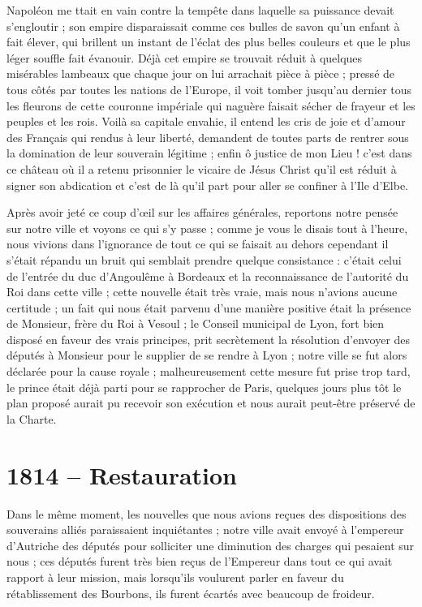 \documentclass[11pt,a4paper]{report}
\begin{document}
Napoléon me ttait en vain contre la tempête dans laquelle sa puissance devait s'engloutir ; son empire disparaissait comme ces bulles de savon qu'un enfant à fait élever, qui brillent un instant de l'éclat des plus belles couleurs et que le plus léger souffle fait évanouir. Déjà cet empire se trouvait réduit à quelques misérables lambeaux que chaque jour on lui arrachait pièce à pièce ; pressé de tous côtés par toutes les nations de l'Europe, il voit tomber jusqu'au dernier tous les fleurons de cette couronne impériale qui naguère faisait sécher de frayeur et les peuples et les rois. Voilà sa capitale envahie, il entend les cris de joie et d'amour des Français qui rendus à leur liberté, demandent de toutes parts de rentrer sous la domination de leur souverain légitime ; enfin ô justice de mon Lieu ! c'est dans ce château où il a retenu prisonnier le vicaire de Jésus Christ qu'il est réduit à signer son abdication et c'est de là qu'il part pour aller se confiner à l'Ile d'Elbe.

Après avoir jeté ce coup d'œil sur les affaires générales, reportons notre pensée sur notre ville et voyons ce qui s'y passe ; comme je vous le disais tout à l'heure, nous vivions dans l'ignorance de tout ce qui se faisait au dehors cependant il s'était répandu un bruit qui semblait prendre quelque consistance : c'était celui de l'entrée du duc d'Angoulême à Bordeaux et la reconnaissance de l'autorité du Roi dans cette ville ; cette nouvelle était très vraie, mais nous n'avions aucune certitude ; un fait qui nous était parvenu d'une manière positive était la présence de Monsieur, frère du Roi à Vesoul ; le Conseil municipal de Lyon, fort bien disposé en faveur des vrais principes, prit secrètement la résolution d'envoyer des députés à Monsieur pour le supplier de se rendre à Lyon ; notre ville se fut alors déclarée pour la cause royale ; malheureusement cette mesure fut prise trop tard, le prince était déjà parti pour se rapprocher de Paris, quelques jours plus tôt le plan proposé aurait pu recevoir son exécution et nous aurait peut-être préservé de la Charte.

\section*{1814 -- Restauration}

Dans le même moment, les nouvelles que nous avions reçues des dispositions des souverains alliés paraissaient inquiétantes ; notre ville avait envoyé à l'empereur d'Autriche des députés pour solliciter une diminution des charges qui pesaient sur nous ; ces députés furent très bien reçus de l'Empereur dans tout ce qui avait rapport à leur mission, mais lorsqu'ils voulurent parler en faveur du rétablissement des Bourbons, ils furent écartés avec beaucoup de froideur.
\end{document}
